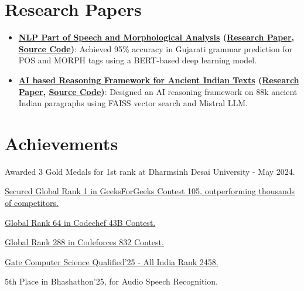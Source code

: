 \documentclass[a4paper,10pt]{article}
\newcommand{\resumeItem}[2]{
  \item\small{
    \textbf{#1}{: #2 \vspace{-2pt}}
  }
}
\newcommand{\resumeSubItem}[2]{\resumeItem{#1}{#2}\vspace{-3pt}}
\newcommand{\resumeSubHeadingListStart}{\begin{itemize}[leftmargin=*]}
\newcommand{\resumeSubHeadingListEnd}{\end{itemize}}
\begin{document}
\section{Research Papers}
\resumeSubHeadingListStart
\resumeSubItem{\href{https://ijisae.org/index.php/IJISAE/article/view/5290/4016}{NLP Part of Speech and Morphological Analysis} (\href{https://ijisae.org/index.php/IJISAE/article/view/5290/4016}{Research Paper}, \href{https://github.com/om-ashish-soni/nlp-research-pos-morph-analysis-gujarti/tree/main}{Source Code})}
{Achieved 95\% accuracy in Gujarati grammar prediction for POS and MORPH tags using a BERT-based deep learning model.}
\vspace{2pt}
\resumeSubItem{\href{https://www.researchgate.net/publication/390543632_Vivechan_AI_Extracting_Wisdom_from_Ancient_Indian_Texts_Through_LLM}
{AI based Reasoning Framework for Ancient Indian Texts} (\href{https://www.researchgate.net/publication/390543632_Vivechan_AI_Extracting_Wisdom_from_Ancient_Indian_Texts_Through_LLM}{Research Paper}, \href{https://github.com/om-ashish-soni/vivechan-ai-v3}{Source Code})}
{Designed an AI reasoning framework on 88k ancient Indian paragraphs using FAISS vector search and Mistral LLM.}
\vspace{4pt}
\resumeSubHeadingListEnd

\section{Achievements}
\begin{description}[font=$\bullet$]
\item {Awarded 3 Gold Medals for 1st rank at Dharmsinh Desai University - May 2024.}
\vspace{-5pt}
\item {\href{https://practice.geeksforgeeks.org/contest/gfg-weekly-coding-contest-105/leaderboard}
{Secured Global Rank 1 in GeeksForGeeks Contest 105, outperforming thousands of competitors.} }
\vspace{-5pt}
\item {\href{https://www.codechef.com/rankings/START43B?itemsPerPage=100&order=asc&page=1&search=om_ashish_soni&sortBy=rank}
{Global Rank 64 in Codechef 43B Contest.}}
\vspace{-5pt}
\item {\href{https://codeforces.com/contest/1747/standings/page/2}
{Global Rank 288 in Codeforces 832 Contest.  }}
\vspace{-5pt}
\item {\href{https://drive.google.com/file/d/1DUTp-W9xiTx4kVTVMqlbC6NIAOICt6ct/view?usp=drivesdk}
{Gate Computer Science Qualified'25 - All India Rank 2458.}}
\vspace{-5pt}
\item {5th Place in Bhashathon'25, for Audio Speech Recognition.}
\vspace{2pt}
\end{description}
\end{document}
